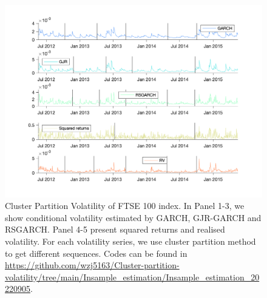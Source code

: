 \documentclass[preprint,12pt,authoryear]{elsarticle}
\begin{document}
\begin{figure}[htbp]
	\begin{center}
		\includegraphics[width=1\textwidth]{Peimin/Volatility_FTSE_CP_GARCH_GJR_RSGARCH.png}
		\caption{
  Cluster Partition Volatility of FTSE 100 index.
			In Panel 1-3, we show conditional volatility estimated by GARCH, GJR-GARCH and RSGARCH. Panel 4-5 present squared returns and realised volatility. For each volatility series, we use cluster partition method to get different sequences.
			Codes can be found in \url{https://github.com/wzj5163/Cluster-partition-volatility/tree/main/Insample_estimation/Insample_estimation_20220905}.
		}
		\label{fig13_ftse} %
	\end{center}
\end{figure}
\end{document}
